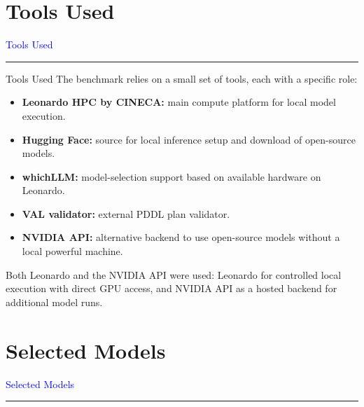 \documentclass{beamer}
\begin{document}
\section{Tools Used}
\begin{frame}[c]
    \centering
    
    {\Huge\textcolor{blue}{Tools Used}}
    
    \vspace{0.1cm}
    
    \textcolor{black}{\rule{10cm}{1pt}}
    
\end{frame}

\begin{frame}{Tools Used}\footnotesize
    The benchmark relies on a small set of tools, each with a specific role:
    \begin{itemize}
        \item \textbf{Leonardo HPC by CINECA:} main compute platform for local model execution.
        \item \textbf{Hugging Face:} source for local inference setup and download of open-source models.
        \item \textbf{whichLLM:} model-selection support based on available hardware on Leonardo.
        \item \textbf{VAL validator:} external PDDL plan validator.
        \item \textbf{NVIDIA API:} alternative backend to use open-source models without a local powerful machine.
    \end{itemize}

    \vspace{0.2cm}
    Both Leonardo and the NVIDIA API were used: Leonardo for controlled local execution with direct GPU access, and NVIDIA API as a hosted backend for additional model runs.
\end{frame}

\section{Selected Models}
\begin{frame}[c]
    \centering
    
    {\Huge\textcolor{blue}{Selected Models}}
    
    \vspace{0.1cm}
    
    \textcolor{black}{\rule{10cm}{1pt}}
    
\end{frame}
\end{document}
